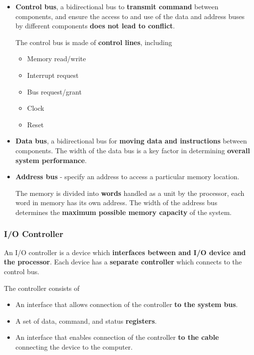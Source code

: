 \begin{itemize}
    \item \textbf{Control bus}, a bidirectional bus to \textbf{transmit command} between components, and ensure the access to and use of the data and address buses by different components \textbf{does not lead to conflict}.

        The control bus is made of \textbf{control lines}, including
        \begin{itemize}
            \item Memory read/write
            \item Interrupt request
            \item Bus request/grant
            \item Clock
            \item Reset
        \end{itemize}
    \item \textbf{Data bus}, a bidirectional bus for \textbf{moving data and instructions} between components. The width of the data bus is a key factor in determining \textbf{overall system performance}.
    \item \textbf{Address bus} - specify an address to access a particular memory location.

        The memory is divided into \textbf{words} handled as a unit by the processor, each word in memory has its own address. The width of the address bus determines the \textbf{maximum possible memory capacity} of the system.
\end{itemize}

\subsubsection*{I/O Controller}

An I/O controller is a device which \textbf{interfaces between and I/O device and the processor}. Each device has a \textbf{separate controller} which connects to the control bus.

The controller consists of
\begin{itemize}
    \item An interface that allows connection of the controller \textbf{to the system bus}.
    \item A set of data, command, and status \textbf{registers}.
    \item An interface that enables connection of the controller \textbf{to the cable} connecting the device to the computer.
\end{itemize}


